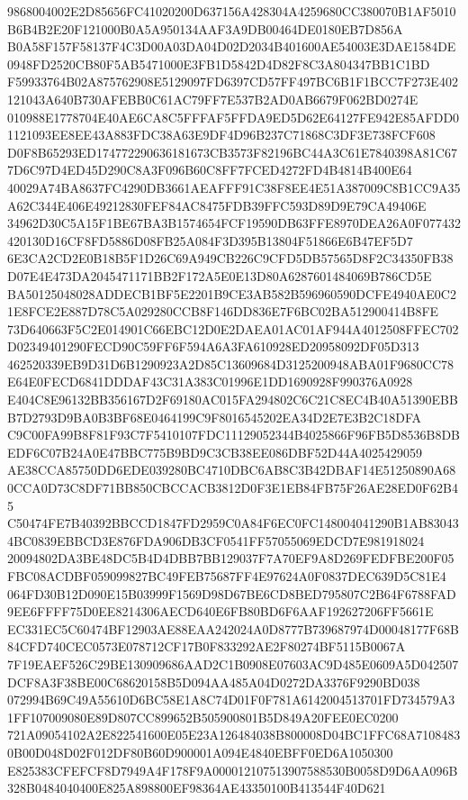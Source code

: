 \documentclass[UTF8,fontset=fandol,zihao=-4,a4paper]{ctexart}
\begin{document}
{{9868004002E2D85656FC41020200D637156A428304A4259680CC380070B1AF5010B6B4B2E20F121000B0A5A950134AAF3A9DB00464DE0180EB7D856A
B0A58F157F58137F4C3D00A03DA04D02D2034B401600AE54003E3DAE1584DE0948FD2520CB80F5AB5471000E3FB1D5842D4D82F8C3A804347BB1C1BD
F59933764B02A875762908E5129097FD6397CD57FF497BC6B1F1BCC7F273E402121043A640B730AFEBB0C61AC79FF7E537B2AD0AB6679F062BD0274E
010988E1778704E40AE6CA8C5FFFAF5FFDA9ED5D62E64127FE942E85AFDD01121093EE8EE43A883FDC38A63E9DF4D96B237C71868C3DF3E738FCF608
D0F8B65293ED174772290636181673CB3573F82196BC44A3C61E7840398A81C677D6C97D4ED45D290C8A3F096B60C8FF7FCED4272FD4B4814B400E64
40029A74BA8637FC4290DB3661AEAFFF91C38F8EE4E51A387009C8B1CC9A35A62C344E406E49212830FEF84AC8475FDB39FFC593D89D9E79CA49406E
34962D30C5A15F1BE67BA3B1574654FCF19590DB63FFE8970DEA26A0F077432420130D16CF8FD5886D08FB25A084F3D395B13804F51866E6B47EF5D7
6E3CA2CD2E0B18B5F1D26C69A949CB226C9CFD5DB57565D8F2C34350FB38D07E4E473DA2045471171BB2F172A5E0E13D80A6287601484069B786CD5E
BA50125048028ADDECB1BF5E2201B9CE3AB582B596960590DCFE4940AE0C21E8FCE2E887D78C5A029280CCB8F146DD836E7F6BC02BA512900414B8FE
73D640663F5C2E014901C66EBC12D0E2DAEA01AC01AF944A4012508FFEC702D02349401290FECD90C59FF6F594A6A3FA610928ED20958092DF05D313
462520339EB9D31D6B1290923A2D85C13609684D3125200948ABA01F9680CC78E64E0FECD6841DDDAF43C31A383C01996E1DD1690928F990376A0928
E404C8E96132BB356167D2F69180AC015FA294802C6C21C8EC4B40A51390EBBB7D2793D9BA0B3BF68E0464199C9F8016545202EA34D2E7E3B2C18DFA
C9C00FA99B8F81F93C7F5410107FDC11129052344B4025866F96FB5D8536B8DBEDF6C07B24A0E47BBC775B9BD9C3CB38EE086DBF52D44A4025429059
AE38CCA85750DD6EDE039280BC4710DBC6AB8C3B42DBAF14E51250890A680CCA0D73C8DF71BB850CBCCACB3812D0F3E1EB84FB75F26AE28ED0F62B45
C50474FE7B40392BBCCD1847FD2959C0A84F6EC0FC148004041290B1AB830434BC0839EBBCD3E876FDA906DB3CF0541FF57055069EDCD7E981918024
20094802DA3BE48DC5B4D4DBB7BB129037F7A70EF9A8D269FEDFBE200F05FBC08ACDBF059099827BC49FEB75687FF4E97624A0F0837DEC639D5C81E4
064FD30B12D090E15B03999F1569D98D67BE6CD8BED795807C2B64F6788FAD9EE6FFFF75D0EE8214306AECD640E6FB80BD6F6AAF192627206FF5661E
EC331EC5C60474BF12903AE88EAA242024A0D8777B739687974D00048177F68B84CFD740CEC0573E078712CF17B0F833292AE2F80274BF5115B0067A
7F19EAEF526C29BE130909686AAD2C1B0908E07603AC9D485E0609A5D042507DCF8A3F38BE00C68620158B5D094AA485A04D0272DA3376F9290BD038
072994B69C49A55610D6BC58E1A8C74D01F0F781A6142004513701FD734579A31FF107009080E89D807CC899652B505900801B5D849A20FEE0EC0200
721A09054102A2E822541600E05E23A126484038B800008D04BC1FFC68A71084830B00D048D02F012DF80B60D900001A094E4840EBFF0ED6A1050300
E825383CFEFCF8D7949A4F178F9A000012107513907588530B0058D9D6AA096B328B0484040400E825A898800EF98364AE43350100B413544F40D621
}}
\end{document}
